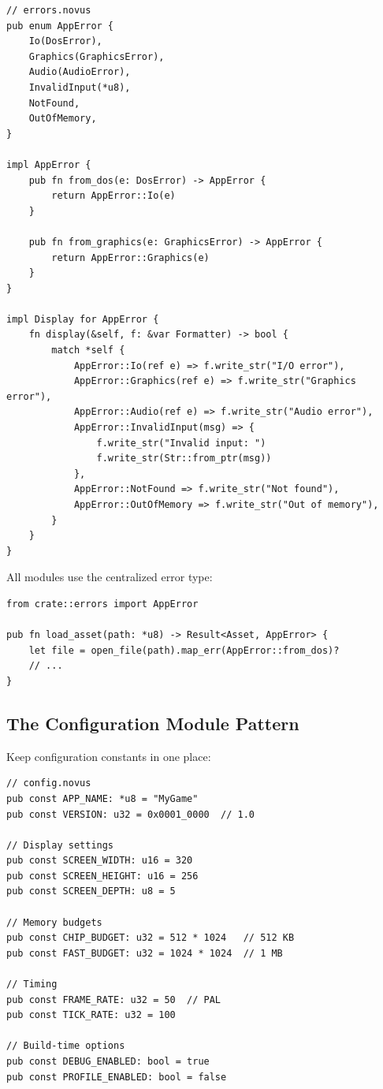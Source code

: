\begin{lstlisting}
// errors.novus
pub enum AppError {
    Io(DosError),
    Graphics(GraphicsError),
    Audio(AudioError),
    InvalidInput(*u8),
    NotFound,
    OutOfMemory,
}

impl AppError {
    pub fn from_dos(e: DosError) -> AppError {
        return AppError::Io(e)
    }

    pub fn from_graphics(e: GraphicsError) -> AppError {
        return AppError::Graphics(e)
    }
}

impl Display for AppError {
    fn display(&self, f: &var Formatter) -> bool {
        match *self {
            AppError::Io(ref e) => f.write_str("I/O error"),
            AppError::Graphics(ref e) => f.write_str("Graphics error"),
            AppError::Audio(ref e) => f.write_str("Audio error"),
            AppError::InvalidInput(msg) => {
                f.write_str("Invalid input: ")
                f.write_str(Str::from_ptr(msg))
            },
            AppError::NotFound => f.write_str("Not found"),
            AppError::OutOfMemory => f.write_str("Out of memory"),
        }
    }
}
\end{lstlisting}

All modules use the centralized error type:

\begin{lstlisting}
from crate::errors import AppError

pub fn load_asset(path: *u8) -> Result<Asset, AppError> {
    let file = open_file(path).map_err(AppError::from_dos)?
    // ...
}
\end{lstlisting}

\subsection{The Configuration Module Pattern}

Keep configuration constants in one place:

\begin{lstlisting}
// config.novus
pub const APP_NAME: *u8 = "MyGame"
pub const VERSION: u32 = 0x0001_0000  // 1.0

// Display settings
pub const SCREEN_WIDTH: u16 = 320
pub const SCREEN_HEIGHT: u16 = 256
pub const SCREEN_DEPTH: u8 = 5

// Memory budgets
pub const CHIP_BUDGET: u32 = 512 * 1024   // 512 KB
pub const FAST_BUDGET: u32 = 1024 * 1024  // 1 MB

// Timing
pub const FRAME_RATE: u32 = 50  // PAL
pub const TICK_RATE: u32 = 100

// Build-time options
pub const DEBUG_ENABLED: bool = true
pub const PROFILE_ENABLED: bool = false
\end{lstlisting}

